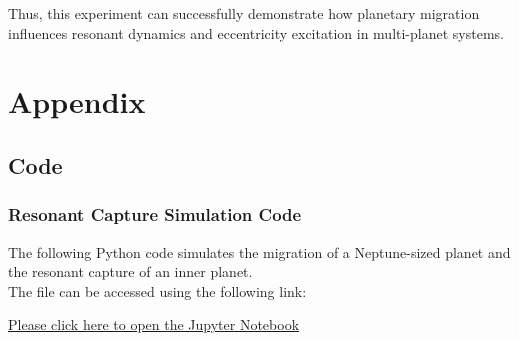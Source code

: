 \documentclass[12pt,a4paper]{article}
\begin{document}
\noindent Thus, this experiment can successfully demonstrate how planetary migration influences resonant dynamics and eccentricity excitation in multi-planet systems.

\setcounter{secnumdepth}{0}

\printbibliography     
\appendix
\section{Appendix}
\subsection{Code}
\subsubsection{Resonant Capture Simulation Code}
The following Python code simulates the migration of a Neptune-sized planet and the resonant capture of an inner planet. 
\\ The file can be accessed using the following link:

\href{https://github.com/PratyushSingh09/Astro-Lab/blob/main/N%20Body/Resonant-Capture.ipynb}{Please click here to open the Jupyter Notebook}
\end{document}

